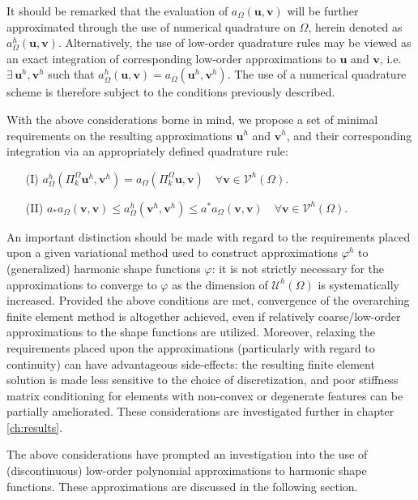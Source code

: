 	It should be remarked that the evaluation of $a_{\Omega}(\bm{u},\bm{v})$ will be further approximated through the use of numerical quadrature on $\Omega$, herein denoted as $a^h_{\Omega}(\bm{u},\bm{v})$. Alternatively, the use of low-order quadrature rules may be viewed as an exact integration of corresponding low-order approximations to $\bm{u}$ and $\bm{v}$, i.e. $\exists \, \bm{u}^h,\bm{v}^h$ such that $a^h_{\Omega}(\bm{u},\bm{v}) = a_{\Omega}(\bm{u}^h,\bm{v}^h)$. The use of a numerical quadrature scheme is therefore subject to the conditions previously described.
	
	With the above considerations borne in mind, we propose a set of minimal requirements on the resulting approximations $\bm{u}^h$ and $\bm{v}^h$, and their corresponding integration via an appropriately defined quadrature rule:
	\begin{itemize}
		\item[(I)] $a^h_{\Omega}(\Pi^{\Omega}_k \bm{u}^h,\bm{v}^h) = a_{\Omega}(\Pi^{\Omega}_k \bm{u},\bm{v}) \quad \forall \bm{v} \in \mathcal{V}^h (\Omega)$.
		\item[(II)] $a_* a_{\Omega} (\bm{v},\bm{v}) \leq a^h_{\Omega} (\bm{v}^h,\bm{v}^h) \leq a^* a_{\Omega} (\bm{v},\bm{v}) \quad \forall \bm{v} \in \mathcal{V}^h (\Omega).$
	\end{itemize}
	
	An important distinction should be made with regard to the requirements placed upon a given variational method used to construct approximations $\varphi^h$ to (generalized) harmonic shape functions $\varphi$: it is not strictly necessary for the approximations to converge to $\varphi$ as the dimension of $\mathcal{U}^h (\Omega)$ is systematically increased. Provided the above conditions are met, convergence of the overarching finite element method is altogether achieved, even if relatively coarse/low-order approximations to the shape functions are utilized. Moreover, relaxing the requirements placed upon the approximations (particularly with regard to continuity) can have advantageous side-effects: the resulting finite element solution is made less sensitive to the choice of discretization, and poor stiffness matrix conditioning for elements with non-convex or degenerate features can be partially ameliorated. These considerations are investigated further in chapter \ref{ch:results}.
	
	The above considerations have prompted an investigation into the use of (discontinuous) low-order polynomial approximations to harmonic shape functions. These approximations are discussed in the following section.
	
